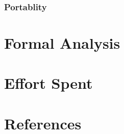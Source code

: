 \documentclass[12pt,a4paper]{report}
\begin{document}
		\subsection{Portablity}

\chapter{Formal Analysis}

\chapter{Effort Spent}

\chapter{References}
\end{document}
